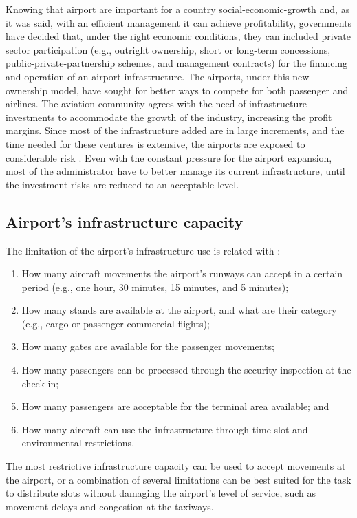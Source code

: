 Knowing that airport are important for a country social-economic-growth and, as it was said, with an efficient management it can achieve profitability, governments have decided that, under the right economic conditions, they can included private sector participation (e.g., outright ownership, short or long-term concessions, public-private-partnership schemes, and management contracts) for the financing and operation of an airport infrastructure. The airports, under this new ownership model, have sought for better ways to compete for both passenger and airlines. The aviation community agrees with the need of infrastructure investments to accommodate the growth of the industry, increasing the profit margins. Since most of the infrastructure added are in large increments, and the time needed for these ventures is extensive, the airports are exposed to considerable risk \cite{ICAO2013}. Even with the constant pressure for the airport expansion, most of the administrator have to better manage its current infrastructure, until the investment risks are reduced to an acceptable level.

\subsection{Airport's infrastructure capacity}

The limitation of the airport’s infrastructure use is related with \cite{ARC2021, WASG2020}:
\begin{enumerate}
	\item How many aircraft movements the airport’s runways can accept in a certain period (e.g., one hour, 30 minutes, 15 minutes, and 5 minutes);
	\item How many stands are available at the airport, and what are their category (e.g., cargo or passenger commercial flights);
	\item How many gates are available for the passenger movements; 
	\item How many passengers can be processed through the security inspection at the check-in;
	\item How many passengers are acceptable for the terminal area available; and
        \item How many aircraft can use the infrastructure through time slot and environmental restrictions.
\end{enumerate}%

The most restrictive infrastructure capacity can be used to accept movements at the airport, or a combination of several limitations can be best suited for the task to distribute slots without damaging the airport’s level of service, such as movement delays and congestion at the taxiways. 


